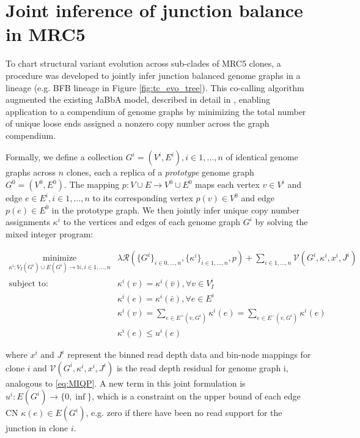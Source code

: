 \documentclass[phd,tocprelim]{cornell}
\begin{document}
\section{Joint inference of junction balance in MRC5} \label{sec:joint_jabba_mrc5}
To chart structural variant evolution across sub-clades of MRC5 clones, a procedure was developed to jointly infer junction balanced genome graphs in a lineage (e.g. BFB lineage in Figure \ref{fig:tc_evo_tree}). This co-calling algorithm augmented the existing JaBbA model, described in detail in \cite{Hadi2020-um}, enabling application to a compendium of genome graphs by minimizing the total number of unique loose ends assigned a nonzero copy number across the graph compendium.  

Formally, we define a collection ${G^i = (V^i, E^i)}, i \in 1,\dots,n$ of identical genome graphs across $n$ clones, each a replica of a \textit{prototype} genome graph $G^0 = (V^0, E^0)$. The mapping $p:V \cup E \rightarrow V^0 \cup E^0$ maps each vertex $v \in V^i$ and edge $e \in E^i,i \in 1,\dots,n$ to its corresponding vertex $p(v)\in V^0$ and edge $p(e) \in E^0$ in the prototype graph. We then jointly infer unique copy number assignments $\kappa^i$ to the vertices and edges of each genome graph $G^i$ by solving the mixed integer program:

\begin{equation} \label{eq:multi_sample_jabba}
    \begin{aligned}
        \underset{\kappa^i:V_I(G^i) \cup E(G^i) \rightarrow \mathbb{N}, i \in 1,\dots,n}{\text{minimize}} &
        \lambda \mathcal{R}(\{G^i\}_{i \in 0, \dots, n}, \{\kappa^i\}_{i \in 1, \dots, n}, p) + \sum_{i \in 1,\dots,n}\mathcal{V}(G^i, \kappa^i, x^i, J^i) \\
        \text{subject to: } & \kappa^i(v) = \kappa^i(\bar{v}), \forall{v \in V_I^i} \\
        & \kappa^i(e) = \kappa^i(\bar{e}), \forall{e \in E^i} \\
        & \kappa^i(v) = \sum_{e \in E^+(v,G^i)}\kappa^i(e) = \sum_{e \in E^-(v, G^i)}\kappa^i(e) \\
        & \kappa^i(e) \le u^i(e)
    \end{aligned}
\end{equation}

where $x^i$ and $J^i$ represent the binned read depth data and bin-node mappings for clone $i$ and  $\mathcal{V}(G^i,κ^i,x^i,J^i)$ is the read depth residual for genome graph i, analogous to \ref{eq:MIQP}.  A new term in this joint formulation is $u^i:E(G^i) \rightarrow \{0,\inf\}$, which is a constraint on the upper bound of each edge CN $\kappa(e) \in E(G^i)$, e.g. zero if there have been no read support for the junction in clone $i$. 
\end{document}

